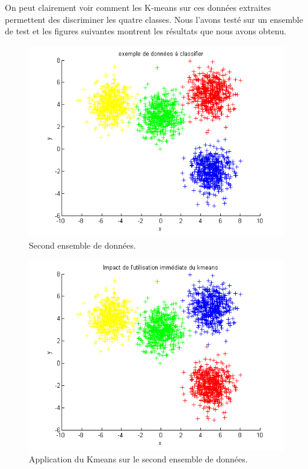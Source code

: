 On peut clairement voir comment les K-means sur ces données extraites permettent des discriminer les quatre classes. Nous l'avons testé sur un ensemble de test et les figures suivantes montrent les résultats que nous avons obtenu.


\begin{figure}[H]
\centering
    \includegraphics[scale=0.6,angle=0]{Images/DataSet2.png}
    \caption{Second ensemble de données.}
    \label{fig:DataSet2}
\end{figure}

\begin{figure}[H]
\centering
    \includegraphics[scale=0.6,angle=0]{Images/AlgoKmeans2.png}
    \caption{Application du Kmeans sur le second ensemble de données.}
    \label{fig:AlgoKmeans2}
\end{figure}

